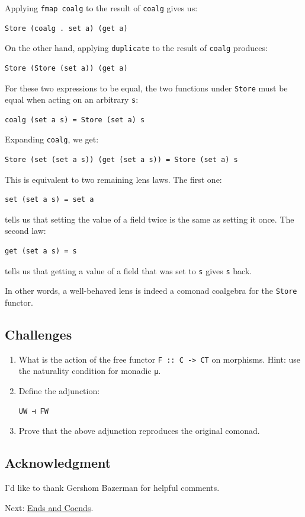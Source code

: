 Applying \texttt{fmap\ coalg} to the result of \texttt{coalg} gives us:

\begin{verbatim}
Store (coalg . set a) (get a)
\end{verbatim}

On the other hand, applying \texttt{duplicate} to the result of
\texttt{coalg} produces:

\begin{verbatim}
Store (Store (set a)) (get a)
\end{verbatim}

For these two expressions to be equal, the two functions under
\texttt{Store} must be equal when acting on an arbitrary \texttt{s}:

\begin{verbatim}
coalg (set a s) = Store (set a) s
\end{verbatim}

Expanding \texttt{coalg}, we get:

\begin{verbatim}
Store (set (set a s)) (get (set a s)) = Store (set a) s
\end{verbatim}

This is equivalent to two remaining lens laws. The first one:

\begin{verbatim}
set (set a s) = set a
\end{verbatim}

tells us that setting the value of a field twice is the same as setting
it once. The second law:

\begin{verbatim}
get (set a s) = s
\end{verbatim}

tells us that getting a value of a field that was set to \texttt{s}
gives \texttt{s} back.

In other words, a well-behaved lens is indeed a comonad coalgebra for
the \texttt{Store} functor.

\subsection{Challenges}\label{challenges}

\begin{enumerate}
\item
  What is the action of the free functor
  \texttt{F\ ::\ C\ -\textgreater{}\ CT} on morphisms. Hint: use the
  naturality condition for monadic \texttt{μ}.
\item
  Define the adjunction:

\begin{verbatim}
UW ⊣ FW
\end{verbatim}
\item
  Prove that the above adjunction reproduces the original comonad.
\end{enumerate}

\subsection{Acknowledgment}\label{acknowledgment}

I'd like to thank Gershom Bazerman for helpful comments.

Next:
\href{https://bartoszmilewski.com/2017/03/29/ends-and-coends/}{Ends and
Coends}.
